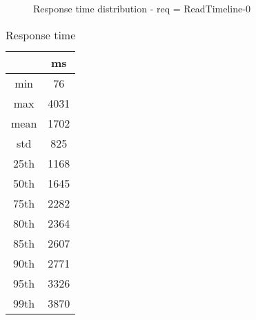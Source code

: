 \begin{minipage}{0.75\linewidth}
\begin{figure}[h]
\begin{adjustbox}{max width=1.0\linewidth, keepaspectratio}
  \end{adjustbox}
  \caption{Response time distribution - req = ReadTimeline-0}
\end{figure}
\end{minipage}\hfill\begin{minipage}{0.18\linewidth}
\begin{table}[h]
\begin{tabular}{|cc|}
\hline
\textbf{} & \textbf{ms}\\ \hline
 \Xhline{0.005\arrayrulewidth}
min & 76\\
 \Xhline{0.005\arrayrulewidth}
max & 4031\\
 \Xhline{0.005\arrayrulewidth}
mean & 1702\\
 \Xhline{0.005\arrayrulewidth}
std & 825\\
\hline
\hline
 \Xhline{0.005\arrayrulewidth}
25th & 1168\\
 \Xhline{0.005\arrayrulewidth}
50th & 1645\\
 \Xhline{0.005\arrayrulewidth}
75th & 2282\\
 \Xhline{0.005\arrayrulewidth}
80th & 2364\\
 \Xhline{0.005\arrayrulewidth}
85th & 2607\\
 \Xhline{0.005\arrayrulewidth}
90th & 2771\\
 \Xhline{0.005\arrayrulewidth}
95th & 3326\\
 \Xhline{0.005\arrayrulewidth}
99th & 3870\\
\hline
\end{tabular}
\caption{Response time}
\end{table}
\end{minipage}\hfill